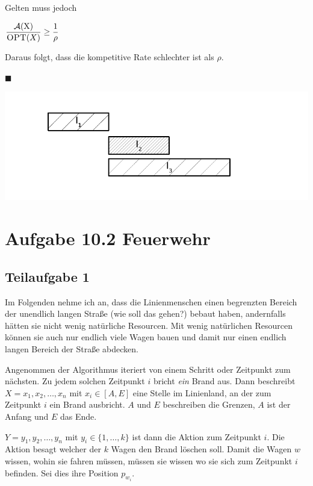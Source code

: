 \documentclass[a4paper, fontsize=10pt]{scrartcl}
\begin{document}
Gelten muss jedoch
  \begin{center}
 $ \dfrac{ \cal{A}\textrm{(X)}}{\textsc{OPT}(X)}\geq \dfrac{1}{\rho }$
  \end{center}



Daraus folgt, dass die kompetitive Rate schlechter ist als $\rho$. \begin{flushright}$\blacksquare$\end{flushright}


  \begin{center}
    \includegraphics[scale=0.7]{aufgabe1b.pdf}
  \end{center}
  
\newpage

\section*{Aufgabe 10.2 Feuerwehr}

\subsection*{Teilaufgabe 1}

Im Folgenden nehme ich an, dass die Linienmenschen einen begrenzten Bereich der unendlich langen Straße (wie soll das gehen?) bebaut haben, andernfalls hätten sie nicht wenig natürliche Resourcen. Mit wenig natürlichen Resourcen können sie auch nur endlich viele Wagen bauen und damit nur einen endlich langen Bereich der Straße abdecken.\smallskip

Angenommen der Algorithmus iteriert von einem Schritt oder Zeitpunkt zum nächsten. Zu jedem solchen Zeitpunkt $i$ bricht \emph{ein} Brand aus. Dann beschreibt $X=x_1,x_2,\dots,x_n$ mit $x_i\in [A,E]$ eine Stelle im Linienland, an der zum Zeitpunkt $i$ ein Brand ausbricht. $A$ und $E$ beschreiben die Grenzen, $A$ ist der Anfang und $E$ das Ende.\smallskip

$Y=y_1,y_2,\dots,y_n$ mit $y_i\in \{1,\dots,k\}$ ist dann die Aktion zum Zeitpunkt $i$. Die Aktion besagt welcher der $k$ Wagen den Brand löschen soll. Damit die Wagen $w$ wissen, wohin sie fahren müssen, müssen sie wissen wo sie sich zum Zeitpunkt $i$ befinden. Sei dies ihre Position $p_{w_{i}}$. \smallskip
\end{document}
